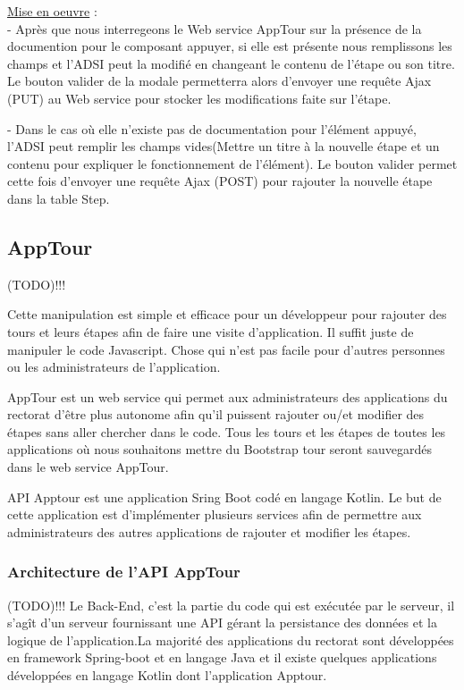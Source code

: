 \documentclass[12pt]{article}
\begin{document}
\begin{enumerate}
\begin{itemize}
\underline{Mise en oeuvre} : \\


- Après que nous interregeons le Web service AppTour sur la présence de la documention pour le composant appuyer, si elle est présente nous remplissons les champs et l'ADSI peut la modifié en changeant le contenu de l'étape ou son titre. Le bouton valider de la modale permetterra alors d'envoyer une requête Ajax (PUT) au Web service pour stocker les  modifications faite sur l'étape. 

- Dans le cas où elle n'existe pas de documentation pour l'élément appuyé, l'ADSI peut remplir les champs vides(Mettre un titre à la nouvelle étape et un contenu pour expliquer le fonctionnement de l'élément). Le bouton valider permet cette fois d'envoyer une requête Ajax (POST) pour rajouter la nouvelle étape dans la table Step.  

\end{itemize}

\end{enumerate}
\newpage
\subsection{AppTour}   
(TODO)!!!

Cette manipulation est simple et efficace pour un développeur pour rajouter des tours et leurs étapes afin de faire une visite d'application. Il suffit juste de manipuler le code Javascript. Chose qui n'est pas facile pour d'autres personnes ou les administrateurs de l'application.

AppTour est un web service qui permet aux administrateurs des applications du rectorat d'être plus autonome afin qu'il puissent rajouter ou/et modifier des étapes sans aller chercher dans le code. Tous les tours et les étapes de toutes les applications où nous souhaitons mettre du Bootstrap tour seront sauvegardés dans le web service AppTour.   

API Apptour est une application Sring Boot codé en langage Kotlin. Le but de cette application est d’implémenter plusieurs  services afin de permettre aux administrateurs des autres applications de rajouter et modifier les étapes. 

\subsubsection{Architecture de l'API AppTour}
(TODO)!!!
Le Back-End, c’est la partie du code qui est exécutée par le serveur, il s’agît d'un serveur fournissant une API gérant la persistance des données et la logique de l'application.La majorité des applications du rectorat sont développées en framework Spring-boot et en langage Java et il existe quelques applications développées en langage Kotlin dont l'application Apptour.
\end{document}
